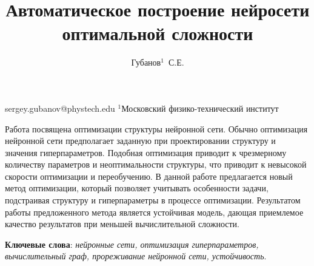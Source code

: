 \documentclass[12pt,twoside]{article}
\begin{document}
\title
    {Автоматическое построение нейросети оптимальной сложности}
\author
    {Губанов$^1$~С.Е.} %
\email
    {sergey.gubanov@phystech.edu}
\organization
    {$^1$Московский физико-технический институт}
\abstract
	{Работа посвящена оптимизации структуры нейронной сети. Обычно оптимизация нейронной сети предполагает заданную при проектировании структуру и значения гиперпараметров. Подобная оптимизация приводит к чрезмерному количеству параметров и неоптимальности структуры, что приводит к невысокой скорости оптимизации и переобучению. В данной работе предлагается новый метод оптимизации, который позволяет учитывать особенности задачи, подстраивая структуру и гиперпараметры в процессе оптимизации. Результатом работы предложенного метода является устойчивая модель, дающая приемлемое качество результатов при меньшей вычислительной сложности.
		
\bigskip
\textbf{Ключевые слова}: \emph {нейронные сети, оптимизация гиперпараметров, вычислительный граф, прореживание нейронной сети, устойчивость}.

}
\maketitle



\end{document}

